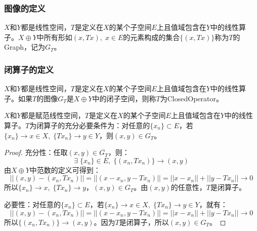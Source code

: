 \subsubsection{图像的定义}
\begin{definition}
	$X$和$Y$都是线性空间，$T$是定义在$X$的某个子空间$E$上且值域包含在$Y$中的线性算子。$X\oplus Y$中所有形如$(x,Tx),\;x\in E$的元素构成的集合$\{(x,Tx)\}$称为$T$的\gls{Graph}，记为$G_T$。
\end{definition}
\subsubsection{闭算子的定义}
\begin{definition}
	$X$和$Y$都是线性空间，$T$是定义在$X$的某个子空间$E$上且值域包含在$Y$中的线性算子。如果$T$的图像$G_T$是$X\oplus Y$中的闭子空间，则称$T$为\gls{ClosedOperator}。
\end{definition}
\begin{theorem}
	$X$和$Y$都是赋范线性空间，$T$是定义在$X$的某个子空间$E$上且值域包含在$Y$中的线性算子。$T$为闭算子的充分必要条件为：对任意的$\{x_n\}\subset E$，若$\{x_n\}\to x\in X,\;\{Tx_n\}\to y\in Y$，则$(x,y)\in G_T$。
\end{theorem}
\begin{proof}
	充分性：任取$(x,y)\in\overline{G_T}$，则：
	\begin{equation*}
		\exists\;\{x_n\}\in E,\;\{(x_n,Tx_n)\}\to(x,y)
	\end{equation*}
	由$X\oplus Y$中范数的定义可得到：
	\begin{equation*}
		||(x,y)-(x_n,Tx_n)||=||(x-x_n,y-Tx_n)||=||x-x_n||+||y-Tx_n||\to0
	\end{equation*}
	所以$\{x_n\}\to x,\;\{Tx_n\}\to y$，$(x,y)\in G_T$。由$(x,y)$的任意性，$T$是闭算子。\par
	必要性：对任意的$\{x_n\}\subset E$，若$\{x_n\}\to x\in X,\;\{Tx_n\}\to y\in Y$，就有：
	\begin{equation*}
		||(x,y)-(x_n,Tx_n)||=||(x-x_n,y-Tx_n)||=||x-x_n||+||y-Tx_n||\to0
	\end{equation*}
	所以$\{(x_n,Tx_n)\}\to(x,y)$。因为$T$是闭算子，所以$(x,y)\in G_T$。
\end{proof}
